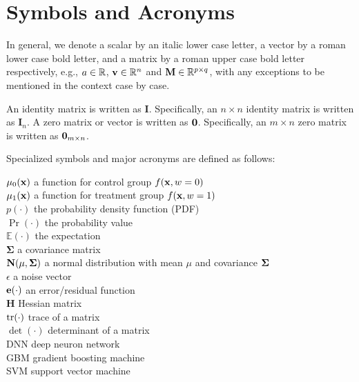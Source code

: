 \chapter*{Symbols and Acronyms}
\label{chap:sym}

In general, we denote a scalar by an italic lower case letter,
a vector by a roman lower case bold letter,
and a matrix by a roman upper case bold letter respectively, e.g., 
$a \in \mathbb{R} $, $\mathbf{v} \in \mathbb{R}^n$ and $\mathbf{M} \in \mathbb{R}^{p \times q}$, with any exceptions to be mentioned in the context case by case.

An identity matrix is written as $\mathbf{I}$. Specifically, an $n\times n$ identity matrix is written as $\mathbf{I}_n$.
A zero matrix or vector is written as ${\bf 0}$. Specifically, an $m\times n$ zero matrix is written as ${\bf 0}_{m\times n}$.

Specialized symbols and major acronyms are defined as follows:

\newpage

\noindent
$\mu_0(\mathbf{x})$                          \hfill  a function for control group $f(\mathbf{x}, w = 0)$ \\
$\mu_1(\mathbf{x})$                          \hfill  a function for treatment group $f(\mathbf{x}, w = 1)$ \\
$p(\cdot)$                     \hfill the probability density function (PDF) \\
$\Pr(\cdot)$                   \hfill the probability value \\
$\mathbb{E}(\cdot)$            \hfill  the expectation \\
$\bm\Sigma$                    \hfill a covariance matrix \\
$\mathbf{N}(\mu,\bm\Sigma)$             \hfill a normal distribution with mean $\mu$ and covariance $\bm\Sigma$ \\
$\epsilon$                     \hfill a noise vector \\
${\bf e}(\cdot)$               \hfill an error/residual function \\
$\mathbf{H}$                   \hfill Hessian matrix \\
$\mathrm{tr}(\cdot)$                   \hfill trace of a matrix \\
$\det(\cdot)$                  \hfill determinant of a matrix \\

\newpage
\noindent
DNN       \hfill deep neuron network                  \\
GBM       \hfill gradient boosting machine            \\
SVM       \hfill support vector machine               \\

